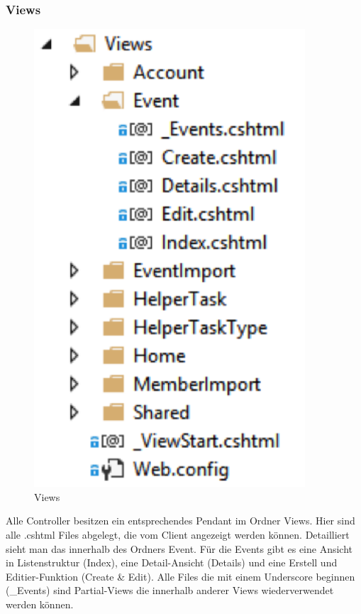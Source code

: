 		\subsubsection{Views}

			\begin{figure}[h]
		  		\vspace{-5pt}
		    	\centering
		    	 \includegraphics[width=0.9\textwidth]{content/architekturdokumentation/images/web-4-Views.png}
		  		\vspace{-25pt}
				\caption{Views}
			\end{figure}

			Alle Controller besitzen ein entsprechendes Pendant im Ordner Views. Hier sind alle .cshtml Files abgelegt, die vom Client angezeigt werden können.
			Detailliert sieht man das innerhalb des Ordners Event. Für die Events gibt es eine Ansicht in Listenstruktur (Index), eine Detail-Ansicht (Details) und eine Erstell und Editier-Funktion (Create \& Edit). Alle Files die mit einem Underscore beginnen (\_Events) sind Partial-Views die innerhalb anderer Views wiederverwendet werden können.

